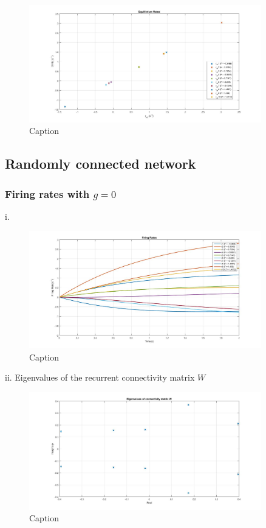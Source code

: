 \documentclass{article}
\begin{document}
	\begin{figure}[H] 
		\begin{center}
			\includegraphics[width=0.9\textwidth]{Section1/Part1/Q1d.jpg}
			\caption{Caption \label{Q1d}}
		\end{center}
	\end{figure}
	
\subsection{Randomly connected network}

\subsubsection{Firing rates with $g = 0$}
i. 
\begin{figure}[H] 
\begin{center}
	\includegraphics[width=0.9\textwidth]{Section1/Part2/Retry/Q2a_i.jpg}
	\caption{Caption \label{Q2a_i}}
\end{center}
\end{figure}

ii. Eigenvalues of the recurrent connectivity matrix $W$
\begin{figure}[H] 
	\begin{center}
		\includegraphics[width=0.9\textwidth]{Section1/Part2/Retry/Q2a_ii.jpg}
		\caption{Caption \label{Q2a_ii}}
	\end{center}
\end{figure}
\end{document}
